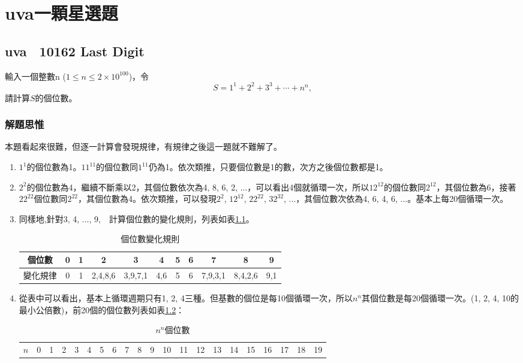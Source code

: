 \chapter{uva一顆星選題}

\section{uva　10162 Last Digit}
輸入一個整數n ($1\le n\le 2\times 10^{100}$)，令
$$ S = 1^1 + 2^2 + 3^3 + \cdots + n^n, $$
請計算$S$的個位數。

\subsection{解題思惟}
本題看起來很難，但逐一計算會發現規律，有規律之後這一題就不難解了。
\begin{enumerate}
	\item $1^1$的個位數為1。$11^{11}$的個位數同$1^{11}$仍為1。依次類推，只要個位數是1的數，次方之後個位數都是1。
	\item $2^2$的個位數為4，繼續不斷乘以2，其個位數依次為4, 8, 6, 2, ...，可以看出4個就循環一次，所以$12^{12}$的個位數同$2^{12}$，其個位數為6，接著$22^{22}$個位數同$2^{22}$，其個位數為4。依次類推，可以發現$2^2$, $12^{12}$, $22^{22}$, $32^{32}$, ...，其個位數次依為4, 6, 4, 6, ...。基本上每20個循環一次。
	\item 同樣地,針對3, 4, ..., 9,　計算個位數的變化規則，列表如表\ref{dtable}。
	\begin{table}[h]
	\caption{個位數變化規則}
	\label{dtable}
	\centering
	\begin{tabular}{|c|c|c|c|c|c|c|c|c|c|c|}
		\hline 
		個位數 & 0 & 1 & 2 & 3 & 4 & 5 & 6 & 7 & 8 & 9 \\ 
		\hline 
		變化規律 & 0 & 1 & 2,4,8,6 & 3,9,7,1 & 4,6 & 5 & 6 & 7,9,3,1 & 8,4,2,6 & 9,1 \\ 
		\hline 
	\end{tabular} 
	\end{table}
	\item 從表中可以看出，基本上循環週期只有1, 2, 4三種。但基數的個位是每10個循環一次，所以$n^n$其個位數是每20個循環一次。(1, 2, 4, 10的最小公倍數)，前20個的個位數列表如表\ref{stable}：
	\begin{table}[h]
	\caption{$n^n$個位數}
	\label{stable}
	\centering
	\begin{tabular}{|c|c|c|c|c|c|c|c|c|c|c|c|c|c|c|c|c|c|c|c|c|}
		\hline 
		$n$ & 0 & 1 & 2 & 3 & 4 & 5 & 6 & 7 & 8 & 9 & 10 & 11 & 12 & 13 & 14 & 15 & 16 & 17 & 18 & 19\\ 

\end{tabular}
\end{table}
\end{enumerate}
